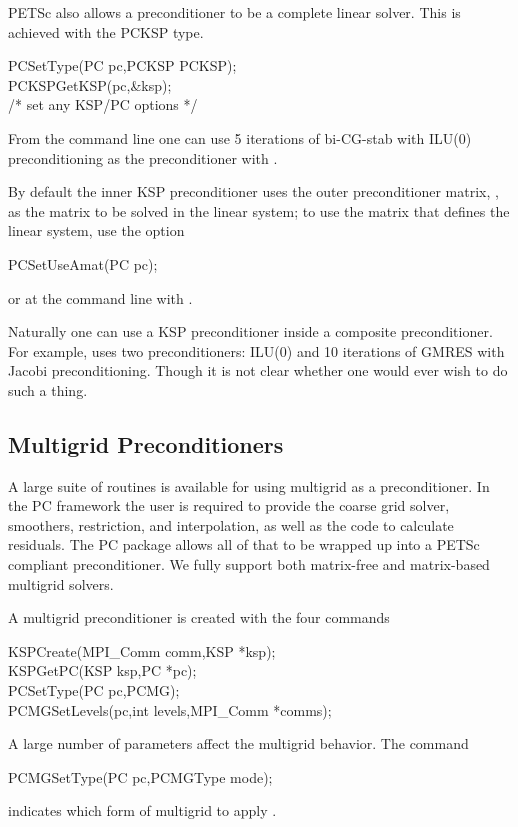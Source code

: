 PETSc also allows a preconditioner to be a complete linear solver. This is
achieved with the PCKSP type.
\begin{tabbing}
  PCSetType(PC pc,PCKSP PCKSP);\\
  PCKSPGetKSP(pc,\&ksp);\\
   /* set any KSP/PC options */
\end{tabbing}
From the command line one can use 5 iterations of
bi-CG-stab with ILU(0) preconditioning as the preconditioner with
.

By default the inner KSP preconditioner uses the outer preconditioner matrix, ,
as the matrix to be solved in the linear system; to use the matrix that defines the linear system,  use the
option
\begin{tabbing}
  PCSetUseAmat(PC pc);
\end{tabbing}
or at the command line with . 

Naturally one can use a KSP preconditioner inside a composite preconditioner. For example,
uses two preconditioners: ILU(0) and 10 iterations of GMRES with Jacobi preconditioning. Though
it is not clear whether one would ever wish to do such a thing.

\subsection{Multigrid Preconditioners}  \label{sec_mg}

A large suite of routines is available for using multigrid as a
preconditioner. In the PC framework the user is required to provide
the coarse grid solver, smoothers, restriction, and interpolation,
as well as the code to calculate residuals. The PC package
allows all of that to be wrapped up into a PETSc compliant preconditioner.
We fully support both matrix-free and matrix-based multigrid solvers.

A multigrid preconditioner is created with the four commands
\begin{tabbing}
  KSPCreate(MPI\_Comm comm,KSP *ksp);\\
  KSPGetPC(KSP ksp,PC *pc);\\
  PCSetType(PC pc,PCMG);\\
  PCMGSetLevels(pc,int levels,MPI\_Comm *comms);
\end{tabbing}
A
large number of parameters affect the multigrid behavior. The command
\begin{tabbing}
  PCMGSetType(PC pc,PCMGType mode);
\end{tabbing}
indicates which form of multigrid to apply \cite{1sbg}.
  

